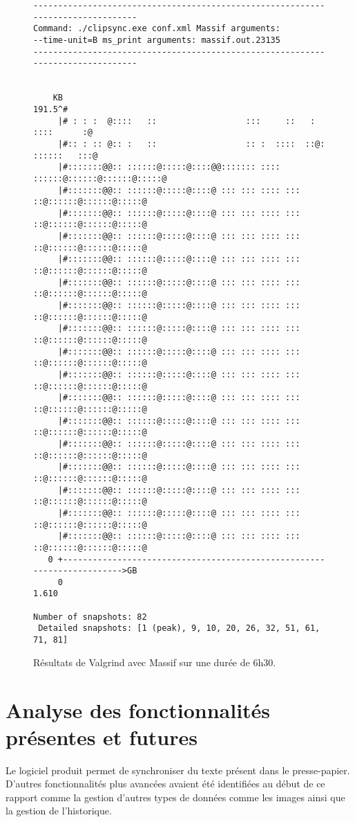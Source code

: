 \begin{figure}[!h]
  \centering
  \scriptsize{
\begin{verbatim}
--------------------------------------------------------------------------------
Command: ./clipsync.exe conf.xml Massif arguments:
--time-unit=B ms_print arguments: massif.out.23135
--------------------------------------------------------------------------------


    KB
191.5^#
     |# : : :  @::::   ::                  :::     ::   :         ::::      :@
     |#:: : :: @:: :   ::                  :: :  ::::  ::@:      ::::::   :::@
     |#:::::::@@:: ::::::@:::::@::::@@::::::: :::: ::::::@::::::@::::::@:::::@
     |#:::::::@@:: ::::::@:::::@::::@ ::: ::: :::: ::: ::@::::::@::::::@:::::@
     |#:::::::@@:: ::::::@:::::@::::@ ::: ::: :::: ::: ::@::::::@::::::@:::::@
     |#:::::::@@:: ::::::@:::::@::::@ ::: ::: :::: ::: ::@::::::@::::::@:::::@
     |#:::::::@@:: ::::::@:::::@::::@ ::: ::: :::: ::: ::@::::::@::::::@:::::@
     |#:::::::@@:: ::::::@:::::@::::@ ::: ::: :::: ::: ::@::::::@::::::@:::::@
     |#:::::::@@:: ::::::@:::::@::::@ ::: ::: :::: ::: ::@::::::@::::::@:::::@
     |#:::::::@@:: ::::::@:::::@::::@ ::: ::: :::: ::: ::@::::::@::::::@:::::@
     |#:::::::@@:: ::::::@:::::@::::@ ::: ::: :::: ::: ::@::::::@::::::@:::::@
     |#:::::::@@:: ::::::@:::::@::::@ ::: ::: :::: ::: ::@::::::@::::::@:::::@
     |#:::::::@@:: ::::::@:::::@::::@ ::: ::: :::: ::: ::@::::::@::::::@:::::@
     |#:::::::@@:: ::::::@:::::@::::@ ::: ::: :::: ::: ::@::::::@::::::@:::::@
     |#:::::::@@:: ::::::@:::::@::::@ ::: ::: :::: ::: ::@::::::@::::::@:::::@
     |#:::::::@@:: ::::::@:::::@::::@ ::: ::: :::: ::: ::@::::::@::::::@:::::@
     |#:::::::@@:: ::::::@:::::@::::@ ::: ::: :::: ::: ::@::::::@::::::@:::::@
     |#:::::::@@:: ::::::@:::::@::::@ ::: ::: :::: ::: ::@::::::@::::::@:::::@
     |#:::::::@@:: ::::::@:::::@::::@ ::: ::: :::: ::: ::@::::::@::::::@:::::@
   0 +----------------------------------------------------------------------->GB
     0                                                                   1.610

Number of snapshots: 82
 Detailed snapshots: [1 (peak), 9, 10, 20, 26, 32, 51, 61, 71, 81]
\end{verbatim}}
    \caption{Résultats de Valgrind avec Massif sur une durée de 6h30.}
    \label{fig:massif}
\end{figure}
\section{Analyse des fonctionnalités présentes et
futures}
Le logiciel produit permet de synchroniser du texte présent dans le
presse-papier. D'autres fonctionnalités plus avancées avaient été identifiées
au début de ce rapport comme la gestion d'autres types de données comme
les images ainsi que la gestion de l'historique.

